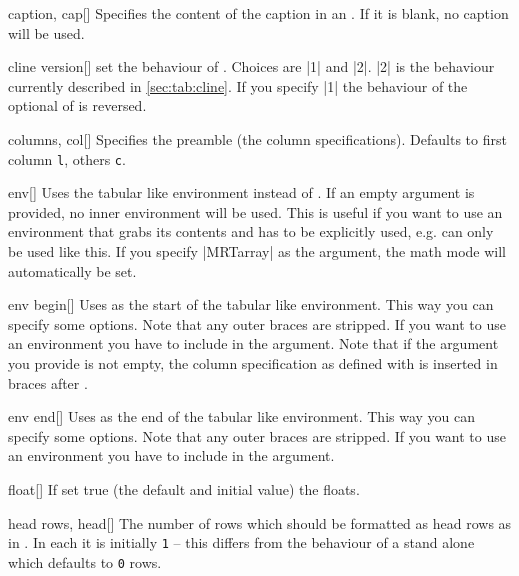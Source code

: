 \begin{describeopt}{caption, cap}[]%
  Specifies the content of the caption in an . If it is blank, no
  caption will be used.
\end{describeopt}%
\begin{describeopt}{cline version}[]%
  set the behaviour of . Choices are |1| and |2|. |2| is the
  behaviour currently described in \autoref{sec:tab:cline}. If you specify |1|
  the behaviour of the optional \meta{!} of  is reversed.
\end{describeopt}%
\begin{describeopt}{columns, col}[]%
  Specifies the  preamble (the column specifications). Defaults
  to first column \texttt{l}, others \texttt{c}.
\end{describeopt}%
\begin{describeopt}{env}[]%
  Uses the tabular like environment  instead of . If
  an empty argument is provided, no inner environment will be used. This is
  useful if you want to use an environment that grabs its contents and has to be
  explicitly used, e.g.  can only be used like this. If you
  specify \bverb|MRTarray| as the argument, the math mode will automatically be
  set.
\end{describeopt}%
\begin{describeopt}{env begin}[]%
  Uses  as the start of the tabular like environment. This way you
  can specify some options. Note that any outer braces are stripped. If you want
  to use an environment you have to include  in the argument. Note
  that if the argument you provide is not empty, the column specification as
  defined with  is inserted in braces after .
\end{describeopt}%
\begin{describeopt}{env end}[]%
  Uses  as the end of the tabular like environment. This way you can
  specify some options. Note that any outer braces are stripped. If you want to
  use an environment you have to include  in the argument.
\end{describeopt}%
\begin{describeopt}{float}[]%
  If set true (the default and initial value) the  floats.
\end{describeopt}%
\begin{describeopt}{head rows, head}[]%
  The number of rows which should be formatted as head rows as in
  . In each  it is initially \texttt{1} -- this
  differs from the behaviour of a stand alone  which defaults to
  \texttt{0} rows.
\end{describeopt}%
